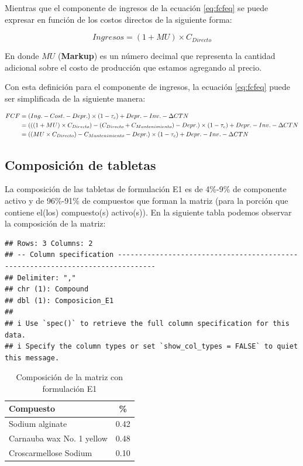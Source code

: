 \documentclass[
]{book}
\begin{document}
Mientras que el componente de ingresos de la ecuación \eqref{eq:fcfeq} se puede
expresar en función de los costos directos de la siguiente forma:

  \begin{equation}
  Ingresos = (1+MU) \times C_{Directo}
  \label{eq:ingresos}
  \end{equation}

En donde \(MU\) (\textbf{Markup}) es un número decimal que representa la cantidad
adicional sobre el costo de producción que estamos agregando al precio.

Con esta definición para el componente de ingresos, la ecuación \eqref{eq:fcfeq}
puede ser simplificada de la siguiente manera:

\begin{align}
  FCF & = (Ing. - Cost. - Depr.) \times (1-\tau_{c}) + Depr. - Inv. - \Delta CTN 
  \notag \\
  & = \left( \left((1 + MU) \times C_{Directo} \right) - 
  (C_{Directo} + C_{Mantenimiento})-Depr. \right)
  \times (1-\tau_{c}) + Depr. - Inv. - \Delta CTN \notag \\
  & = \left( \left(MU \times C_{Directo} \right) - C_{Mantenimiento} - Depr.
  \right)
  \times (1-\tau_{c}) + Depr. - Inv. - \Delta CTN
  \label{eq:fcfmod}
\end{align}

\hypertarget{composiciuxf3n-de-tabletas}{%
\subsection{Composición de tabletas}\label{composiciuxf3n-de-tabletas}}

La composición de las tabletas de formulación E1 es de 4\%-9\% de componente
activo y de 96\%-91\% de compuestos que forman la matriz (para la porción que
contiene el(los) compuesto(s) activo(s)). En la siguiente tabla podemos observar
la composición de la matriz:

\begin{verbatim}
## Rows: 3 Columns: 2
## -- Column specification -------------------------------------------------------------------------------
## Delimiter: ","
## chr (1): Compound
## dbl (1): Composicion_E1
## 
## i Use `spec()` to retrieve the full column specification for this data.
## i Specify the column types or set `show_col_types = FALSE` to quiet this message.
\end{verbatim}

\begin{table}

\caption{\label{tab:tabcomposicion}Composición de la matriz con formulación E1}
\centering
\begin{tabular}[t]{l|c}
\hline
Compuesto & \%\\
\hline
Sodium alginate & 0.42\\
\hline
Carnauba wax No. 1 yellow & 0.48\\
\hline
Croscarmellose Sodium & 0.10\\
\hline
\end{tabular}
\end{table}
\end{document}
